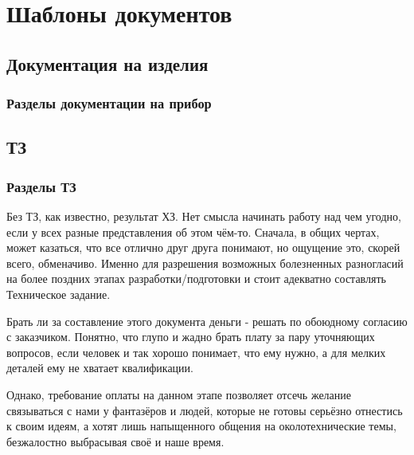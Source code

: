 \part[Docs]{Шаблоны документов}
\chapter[Hardware_Doc]{Документация на изделия}
\section[Необходимые_разделы]{Разделы документации на прибор}

\chapter[TZ]{ТЗ}
\section[TZ_Parts]{Разделы ТЗ}
Без ТЗ, как известно, результат ХЗ. Нет смысла начинать работу над чем угодно, если у всех разные представления об этом чём-то. Сначала, в общих чертах, может казаться, что все отлично друг друга понимают, но ощущение это, скорей всего, обменачиво. Именно для разрешения возможных болезненных разногласий на более поздних этапах разработки/подготовки и стоит адекватно составлять Техническое задание.

Брать ли за составление этого документа деньги - решать по обоюдному согласию с заказчиком. Понятно, что глупо и жадно брать плату за пару уточняющих вопросов, если человек и так хорошо понимает, что ему нужно, а для мелких деталей ему не хватает квалификации.

Однако, требование оплаты на данном этапе позволяет отсечь желание связываться с нами у фантазёров и людей, которые не готовы серьёзно отнестись к своим идеям, а хотят лишь напыщенного общения на околотехнические темы, безжалостно выбрасывая своё и наше время.
